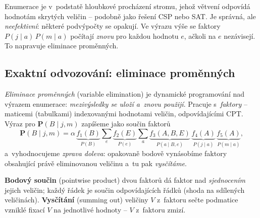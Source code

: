 \begin{intuice}
Enumerace je v~podstatě hloubkové procházení stromu, jehož větvení odpovídá hodnotám skrytých veličin -- podobně jako řešení CSP nebo SAT. Je správná, ale \emph{neefektivní}: některé podvýpočty se opakují. Ve výrazu výše se faktory $P(j\mid a)\,P(m\mid a)$ počítají \emph{znovu} pro každou hodnotu $e$, ačkoli na $e$ nezávisejí. To napravuje eliminace proměnných.
\end{intuice}

\subsection{Exaktní odvozování: eliminace proměnných}

\emph{Eliminace proměnných} (variable elimination) je dynamické programování nad výrazem enumerace: \emph{mezivýsledky se uloží a~znovu použijí}. Pracuje s~\emph{faktory} -- maticemi (tabulkami) indexovanými hodnotami veličin, odpovídajícími CPT. Výraz pro $\mathbf{P}(B\mid j,m)$ zapíšeme jako součin faktorů
\[ \mathbf{P}(B\mid j,m)=\alpha\,\underbrace{f_1(B)}_{P(B)}\sum_{e}\underbrace{f_2(E)}_{P(e)}\sum_{a}\underbrace{f_3(A,B,E)}_{P(a\mid B,e)}\,\underbrace{f_4(A)}_{P(j\mid a)}\,\underbrace{f_5(A)}_{P(m\mid a)}, \]
a~vyhodnocujeme \emph{zprava doleva}: opakovaně bodově vynásobíme faktory obsahující právě eliminovanou veličinu a~tu pak \emph{vysčítáme}.

\begin{definice}
\textbf{Bodový součin} (pointwise product) dvou faktorů dá faktor nad \emph{sjednocením} jejich veličin; každý řádek je součin odpovídajících řádků (shoda na sdílených veličinách). \textbf{Vysčítání} (summing out) veličiny $V$ z~faktoru sečte podmatice vzniklé fixací $V$ na jednotlivé hodnoty -- $V$ z~faktoru zmizí.
\end{definice}

